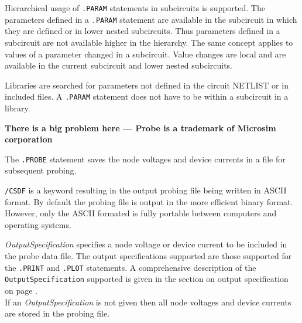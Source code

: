 {\item Hierarchical usage of {\tt .PARAM} statements in subcircuits is
supported.  The parameters defined in a {\tt .PARAM} statement are
available in the subcircuit in which they are defined or in lower nested
subcircuits. Thus parameters defined in a subcircuit are not available
higher in the hierarchy.  The same concept applies to values of a parameter
changed in a subcircuit.  Value changes are local and are available in the
current subcircuit and lower nested subcircuits.

{\item Libraries are searched for parameters not defined in the
      circuit NETLIST or in included files. A {\tt .PARAM} statement does
      not have to be within a subcircuit in a library.}

}





%
%

{\large\bf There is a big problem here --- Probe is a trademark of Microsim
corporation}

The {\tt .PROBE} statement saves the node voltages and device currents in a
file for subsequent probing.


\begin{widelist}

\item[{\tt /CSDF}] is a keyword resulting in the output probing file being
     written in ASCII format.  By default the probing file is output in
     the more efficient binary format. However, only the ASCII formated is
     fully portable between computers and operating systems.

\item[{\it OutputSpecification}] specifies a node voltage or device current
     to be included in the probe data file.
     The output specifications supported are those supported for the
     {\tt .PRINT} and {\tt .PLOT} statements.  A comprehensive
     description of the {\tt OutputSpecification} supported is
     given in the section on output specification
     on page \pageref{.PRINToutputspecification}.\\
     If an {\it OutputSpecification} is not given then all node voltages
     and device currents are stored in the probing file.
\end{widelist}

